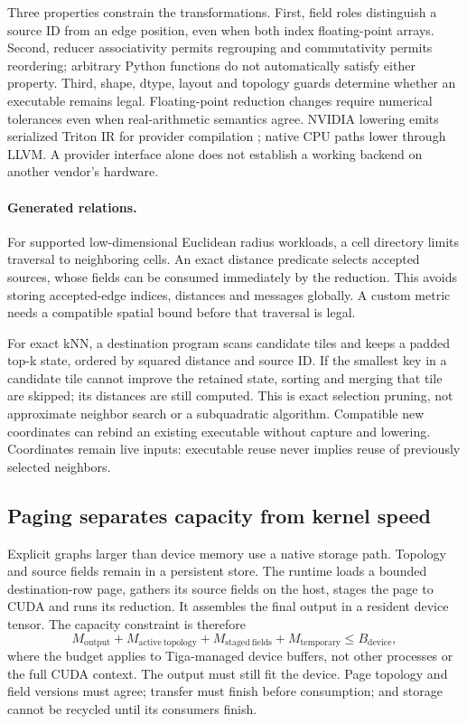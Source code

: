 Three properties constrain the transformations. First, field roles distinguish
a source ID from an edge position, even when both index floating-point arrays.
Second, reducer associativity permits regrouping and commutativity permits
reordering; arbitrary Python functions do not automatically satisfy either
property. Third, shape, dtype, layout and topology guards determine whether an
executable remains legal. Floating-point reduction changes require numerical
tolerances even when real-arithmetic semantics agree. NVIDIA lowering emits
serialized Triton IR for provider compilation \citep{triton}; native CPU paths
lower through LLVM. A provider interface alone does not establish a working
backend on another vendor's hardware.

\paragraph{Generated relations.}
For supported low-dimensional Euclidean radius workloads, a cell directory
limits traversal to neighboring cells. An exact distance predicate selects
accepted sources, whose fields can be consumed immediately by the reduction.
This avoids storing accepted-edge indices, distances and messages globally.
A custom metric needs a compatible spatial bound before that traversal is legal.

For exact kNN, a destination program scans candidate tiles and keeps a padded
top-k state, ordered by squared distance and source ID. If the smallest key
in a candidate tile cannot improve the retained state, sorting and merging
that tile are skipped; its distances are still computed. This is exact
selection pruning, not approximate neighbor search or a subquadratic algorithm.
Compatible new coordinates can rebind an existing executable without capture
and lowering. Coordinates remain live inputs: executable reuse never implies
reuse of previously selected neighbors.

\subsection{Paging separates capacity from kernel speed}
\label{ws:paging}
Explicit graphs larger than device memory use a native storage path. Topology
and source fields remain in a persistent store. The runtime loads a bounded
destination-row page, gathers its source fields on the host, stages the page
to CUDA and runs its reduction. It assembles the final output in a resident
device tensor. The capacity constraint is therefore
$$
M_{\mathrm{output}}+M_{\mathrm{active\ topology}}
+M_{\mathrm{staged\ fields}}+M_{\mathrm{temporary}}
\le B_{\mathrm{device}},
$$
where the budget applies to Tiga-managed device buffers, not other processes
or the full CUDA context. The output must still fit the device. Page topology
and field versions must agree; transfer must finish before consumption; and
storage cannot be recycled until its consumers finish.

